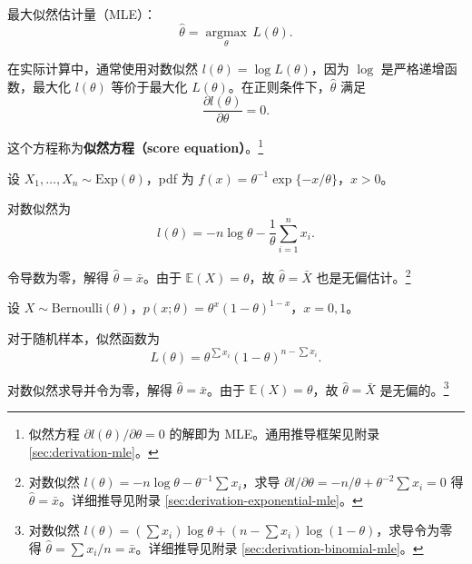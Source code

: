 最大似然估计量（MLE）：
\[
\widehat{\theta} = \underset{\theta}{\operatorname{argmax}} \, L(\theta).
\label{eq:mle-definition}\]

在实际计算中，通常使用对数似然 $l(\theta) = \log L(\theta)$，因为 $\log$ 是严格递增函数，最大化 $l(\theta)$ 等价于最大化 $L(\theta)$。在正则条件下，$\widehat{\theta}$ 满足
\[
\frac{\partial l(\theta)}{\partial \theta} = 0. \label{eq:mle-score-equation}\]

这个方程称为\textbf{似然方程（score equation）}。\footnote{似然方程 $\partial l(\theta)/\partial\theta = 0$ 的解即为 MLE。通用推导框架见附录 \cref{sec:derivation-mle}。}

\begin{example}\label{ex:exponential-mle-ch4}
设 $X_1, \ldots, X_n \sim \mathrm{Exp}(\theta)$，pdf 为 $f(x) = \theta^{-1}\exp\{-x/\theta\}$，$x>0$。

对数似然为
\[
l(\theta) = -n\log\theta - \frac{1}{\theta}\sum_{i=1}^n x_i.
\]

令导数为零，解得 $\widehat{\theta} = \bar{x}$。由于 $\mathbb{E}(X) = \theta$，故 $\widehat{\theta} = \bar{X}$ 也是无偏估计。\footnote{对数似然 $l(\theta) = -n\log\theta - \theta^{-1}\sum x_i$，求导 $\partial l/\partial\theta = -n/\theta + \theta^{-2}\sum x_i = 0$ 得 $\widehat{\theta} = \bar{x}$。详细推导见附录 \cref{sec:derivation-exponential-mle}。}
\end{example}

\begin{example}\label{ex:binomial-mle-ch4}
设 $X \sim \mathrm{Bernoulli}(\theta)$，$p(x;\theta) = \theta^x(1-\theta)^{1-x}$，$x=0,1$。

对于随机样本，似然函数为
\[
L(\theta) = \theta^{\sum x_i}(1-\theta)^{n-\sum x_i}.
\]

对数似然求导并令为零，解得 $\widehat{\theta} = \bar{x}$。由于 $\mathbb{E}(X) = \theta$，故 $\widehat{\theta} = \bar{X}$ 是无偏的。\footnote{对数似然 $l(\theta) = (\sum x_i)\log\theta + (n-\sum x_i)\log(1-\theta)$，求导令为零得 $\widehat{\theta} = \sum x_i/n = \bar{x}$。详细推导见附录 \cref{sec:derivation-binomial-mle}。}
\end{example}

